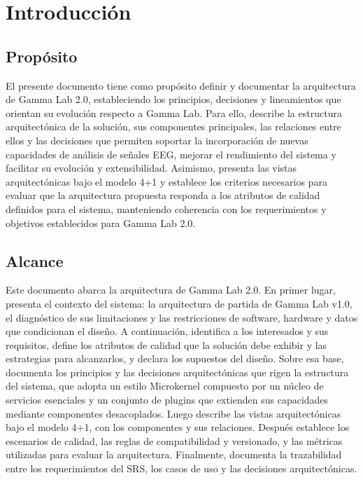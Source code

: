 \documentclass[11pt,a4paper]{article}
\DeclareRobustCommand{\_}{\textunderscore\allowbreak}
\begin{document}
\tableofcontents
\newpage

\listoffigures
\newpage

\listoftables
\newpage

\section{Introducci\'on}

\subsection{Prop\'osito}
El presente documento tiene como propósito definir y documentar la arquitectura
 de Gamma Lab 2.0, estableciendo los principios, decisiones y lineamientos que 
 orientan su evolución respecto a Gamma Lab. Para ello, describe la estructura 
 arquitectónica de la solución, sus componentes principales, las relaciones entre 
 ellos y las decisiones que permiten soportar la incorporación de nuevas capacidades 
 de análisis de señales EEG, mejorar el rendimiento del sistema y facilitar su evolución y 
 extensibilidad. Asimismo, presenta las vistas arquitectónicas bajo el modelo 4+1 y establece 
 los criterios necesarios para evaluar que la arquitectura propuesta responda a los atributos 
 de calidad definidos para el sistema, manteniendo coherencia con los requerimientos y objetivos 
 establecidos para Gamma Lab 2.0.

\subsection{Alcance}
Este documento abarca la arquitectura de Gamma Lab 2.0. En primer lugar,
presenta el contexto del sistema: la arquitectura de partida de Gamma Lab
v1.0, el diagnóstico de sus limitaciones y las restricciones de software,
hardware y datos que condicionan el diseño. A continuación, identifica a los
interesados y sus requisitos, define los atributos de calidad que la
solución debe exhibir y las estrategias para alcanzarlos, y declara los
supuestos del diseño. Sobre esa base, documenta los principios y las
decisiones arquitectónicas que rigen la estructura del sistema, que adopta
un estilo Microkernel compuesto por un núcleo de servicios esenciales y un
conjunto de plugins que extienden sus capacidades mediante componentes
desacoplados. Luego describe las vistas arquitectónicas bajo el modelo 4+1,
con los componentes y sus relaciones. Después establece los escenarios de
calidad, las reglas de compatibilidad y versionado, y las métricas utilizadas
para evaluar la arquitectura. Finalmente, documenta la trazabilidad entre
los requerimientos del SRS, los casos de uso y las decisiones
arquitectónicas.
\end{document}

